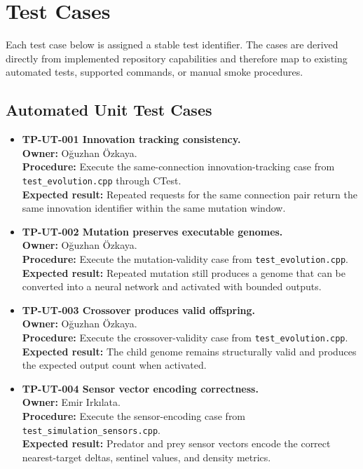 \section{Test Cases}
\label{sec:testcases}

Each test case below is assigned a stable test identifier. The cases are derived directly
from implemented repository capabilities and therefore map to existing automated tests,
supported commands, or manual smoke procedures.

\subsection{Automated Unit Test Cases}

\begin{itemize}[leftmargin=*]
	\item \textbf{TP-UT-001 Innovation tracking consistency.}\\
	      \textbf{Owner:} Oğuzhan Özkaya.\\
	      \textbf{Procedure:} Execute the same-connection innovation-tracking case from
	      \texttt{test\_evolution.cpp} through CTest.\\
	      \textbf{Expected result:} Repeated requests for the same connection pair return the
	      same innovation identifier within the same mutation window.

	\item \textbf{TP-UT-002 Mutation preserves executable genomes.}\\
	      \textbf{Owner:} Oğuzhan Özkaya.\\
	      \textbf{Procedure:} Execute the mutation-validity case from
	      \texttt{test\_evolution.cpp}.\\
	      \textbf{Expected result:} Repeated mutation still produces a genome that can be
	      converted into a neural network and activated with bounded outputs.

	\item \textbf{TP-UT-003 Crossover produces valid offspring.}\\
	      \textbf{Owner:} Oğuzhan Özkaya.\\
	      \textbf{Procedure:} Execute the crossover-validity case from
	      \texttt{test\_evolution.cpp}.\\
	      \textbf{Expected result:} The child genome remains structurally valid and produces
	      the expected output count when activated.

	\item \textbf{TP-UT-004 Sensor vector encoding correctness.}\\
	      \textbf{Owner:} Emir Irkılata.\\
	      \textbf{Procedure:} Execute the sensor-encoding case from
	      \texttt{test\_simulation\_sensors.cpp}.\\
	      \textbf{Expected result:} Predator and prey sensor vectors encode the correct
	      nearest-target deltas, sentinel values, and density metrics.
\end{itemize}

